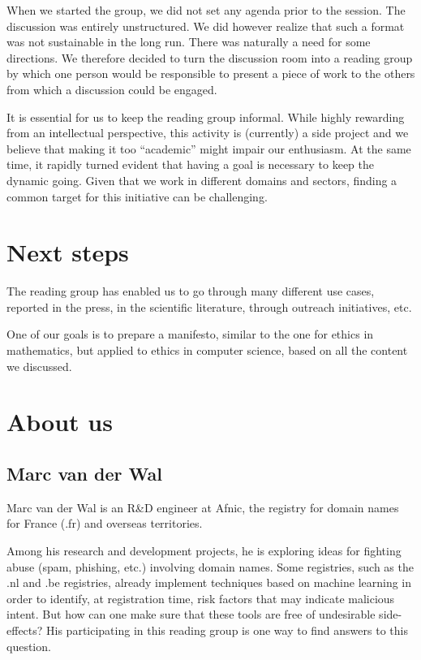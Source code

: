 \documentclass[conference]{IEEEtran}
\begin{document}
When we  started the  group, we did  not set any  agenda prior  to the
session.  The discussion  was  entirely unstructured.  We did  however
realize that such a format was  not sustainable in the long run. There
was naturally a need for some directions. We therefore decided to turn
the discussion room into a reading  group by which one person would be
responsible to  present a  piece of  work to the  others from  which a
discussion could be engaged.

It  is essential  for us  to keep  the reading  group informal.  While
highly rewarding  from an  intellectual perspective, this  activity is
(currently)  a  side  project  and  we  believe  that  making  it  too
“academic” might impair  our enthusiasm. At the same  time, it rapidly
turned evident  that having a  goal is  necessary to keep  the dynamic
going. Given that we work in  different domains and sectors, finding a
common target for this initiative can be challenging.

\section{Next steps}

The reading  group has  enabled us  to go  through many  different use
cases, reported  in the press,  in the scientific  literature, through
outreach initiatives, etc.

One of  our goals is  to prepare a manifesto,  similar to the  one for
ethics  in mathematics,  but applied  to ethics  in computer  science,
based on all the content we discussed.

\section{About us}

\subsection{Marc van der Wal}

Marc van der Wal is an R\&D engineer at Afnic, the registry for domain
names for France (.fr) and overseas territories.

Among his research and development projects, he is exploring ideas for
fighting  abuse (spam,  phishing, etc.)  involving domain  names. Some
registries,  such as  the .nl  and .be  registries, already  implement
techniques  based  on  machine  learning  in  order  to  identify,  at
registration   time,  risk   factors  that   may  indicate   malicious
intent.  But how  can  one make  sure  that these  tools  are free  of
undesirable side-effects?  His participating in this  reading group is
one way to find answers to this question.
\end{document}
